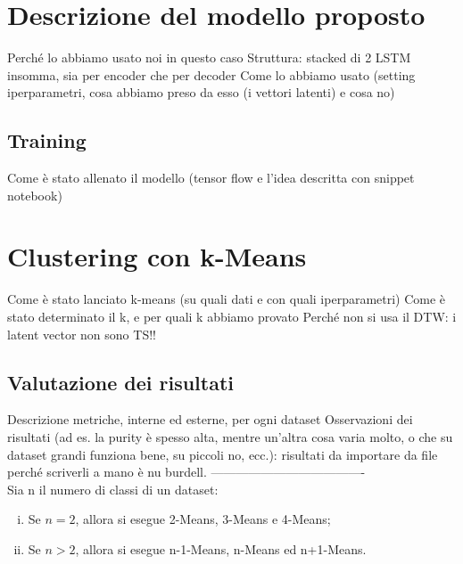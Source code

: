 \section{Descrizione del modello proposto}
Perché lo abbiamo usato noi in questo caso
Struttura: stacked di 2 LSTM insomma, sia per encoder che per decoder
Come lo abbiamo usato (setting iperparametri, cosa abbiamo preso da esso (i vettori latenti) e cosa no)

\subsection{Training}
Come è stato allenato il modello (tensor flow e l'idea descritta con snippet notebook)

\section{Clustering con k-Means}
Come è stato lanciato k-means (su quali dati e con quali iperparametri)
Come è stato determinato il k, e per quali k abbiamo provato
Perché non si usa il DTW: i latent vector non sono TS!!

\subsection{Valutazione dei risultati}
Descrizione metriche, interne ed esterne, per ogni dataset
Osservazioni dei risultati (ad es. la purity è spesso alta, mentre un'altra cosa varia molto, o che su dataset grandi funziona bene, su piccoli no, ecc.): risultati da importare da file perché scriverli a mano è nu burdell.
-------------------------------------\\

Sia n il numero di classi di un dataset:
\begin{enumerate}[(i)]
	\item Se $n=2$, allora si esegue 2-Means, 3-Means e 4-Means;
	\item Se $n>2$, allora si esegue n-1-Means, n-Means ed n+1-Means.
\end{enumerate}

